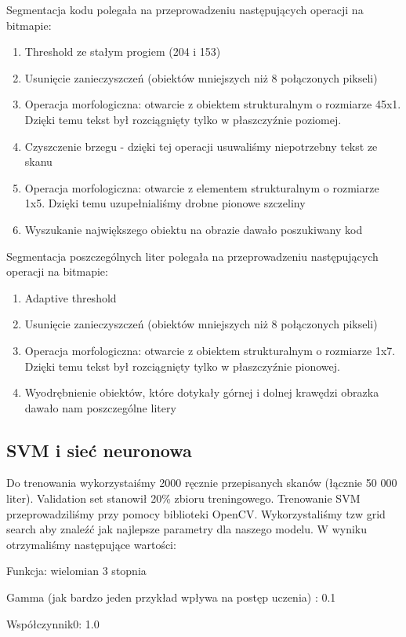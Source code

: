 \documentclass[titlepage,10pt,a4paper]{article}
\begin{document}
Segmentacja kodu polegała na przeprowadzeniu następujących operacji na bitmapie:
\begin{enumerate}
	\item Threshold ze stałym progiem (204 i 153)
	\item Usunięcie zanieczyszczeń (obiektów mniejszych niż 8 połączonych pikseli)
	\item Operacja morfologiczna: otwarcie z obiektem strukturalnym o rozmiarze 45x1. Dzięki temu tekst był rozciągnięty tylko w płaszczyźnie poziomej.
	\item Czyszczenie brzegu - dzięki tej operacji usuwaliśmy niepotrzebny tekst ze skanu
	\item Operacja morfologiczna: otwarcie z elementem strukturalnym o rozmiarze 1x5. Dzięki temu uzupełnialiśmy drobne pionowe szczeliny
	\item Wyszukanie największego obiektu na obrazie dawało poszukiwany kod
\end{enumerate}

Segmentacja poszczególnych liter polegała na przeprowadzeniu następujących operacji na bitmapie:
\begin{enumerate}
	\item Adaptive threshold
	\item Usunięcie zanieczyszczeń (obiektów mniejszych niż 8 połączonych pikseli)
	\item Operacja morfologiczna: otwarcie z obiektem strukturalnym o rozmiarze 1x7. Dzięki temu tekst był rozciągnięty tylko w płaszczyźnie pionowej.
	\item Wyodrębnienie obiektów, które dotykały górnej i dolnej krawędzi obrazka dawało nam poszczególne litery
\end{enumerate}

\subsection{SVM i sieć neuronowa}
Do trenowania wykorzystaiśmy 2000 ręcznie przepisanych skanów (łącznie 50 000 liter). Validation set stanowił 20\% zbioru treningowego.
Trenowanie SVM przeprowadziliśmy przy pomocy biblioteki OpenCV. Wykorzystaliśmy tzw grid search aby znaleźć jak najlepsze parametry dla naszego modelu. W wyniku otrzymaliśmy następujące wartości:

Funkcja: wielomian 3 stopnia

Gamma (jak bardzo jeden przykład wpływa na postęp uczenia) : 0.1

Współczynnik0: 1.0
\end{document}
